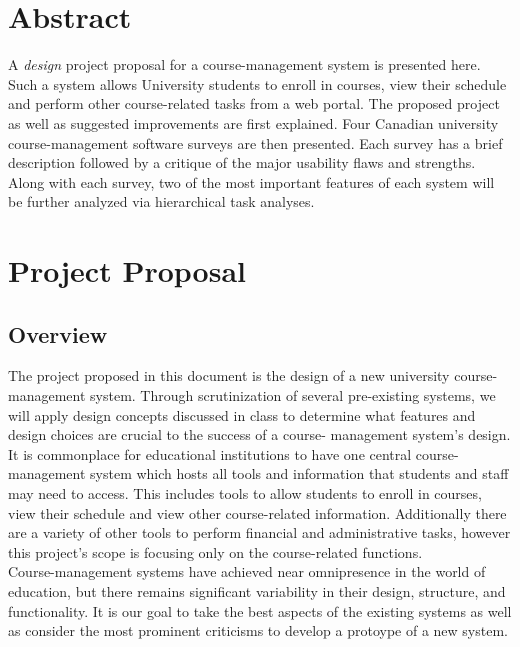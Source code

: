 \documentclass[10pt]{article}
\begin{document}
\begin{multicols}{2}

\section*{Abstract}
A \emph{design} project proposal for a course-management system is presented 
here. Such a system allows University students to enroll in courses, view their 
schedule and perform other course-related tasks from a web portal. The proposed 
project as well as suggested improvements are first explained. Four Canadian 
university course-management software surveys are then presented. Each survey 
has a brief description followed by a critique of the major usability flaws and 
strengths. Along with each survey, two of the most important features of each 
system will be further analyzed via hierarchical task analyses. 

\section*{Project Proposal}

\subsection*{Overview}
The project proposed in this document is the design of a new 
university course-management system. Through scrutinization of several 
pre-existing systems, we will apply design concepts discussed in class to 
determine what features and design choices are crucial to the success of a course-
management system's design.\\

It is commonplace for educational institutions to have one central course-
management system which hosts all tools and information that students and staff 
may need to access. This includes tools to allow students to enroll in courses, 
view their schedule and view other course-related information. Additionally 
there are a variety of other tools to perform financial and administrative 
tasks, however this project's scope is focusing only on the course-related 
functions.\\

Course-management systems have achieved near omnipresence in 
the world of education, but there remains significant variability in their design, 
structure, and functionality. It is our goal to take the best aspects of the 
existing systems as well as consider the most prominent criticisms to develop a protoype of a new system.\\


\end{multicols}
\end{document}
